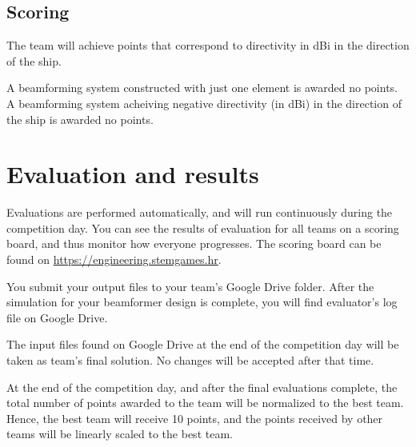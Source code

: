 \documentclass{article}[a4paper]
\begin{document}
\subsection*{Scoring}

The team will achieve points that correspond to directivity in dBi in the direction of the ship.

A beamforming system constructed with just one element is awarded no points. A beamforming system acheiving negative directivity (in dBi) in the direction of the ship is awarded no points.

\section*{Evaluation and results}

Evaluations are performed automatically, and will run continuously during the competition day. You can see the results of evaluation for all teams on a scoring board, and thus monitor how everyone progresses. The scoring board can be found on \url{https://engineering.stemgames.hr}.

You submit your output files to your team's Google Drive folder.
After the simulation for your beamformer design is complete, you will find evaluator's log file on Google Drive.

The input files found on Google Drive at the end of the competition day will be taken as team's final solution. No changes will be accepted after that time.

At the end of the competition day, and after the final evaluations complete, the total number of points awarded to the team will be normalized to the best team. Hence, the best team will receive 10 points, and the points received by other teams will be linearly scaled to the best team.
\end{document}
